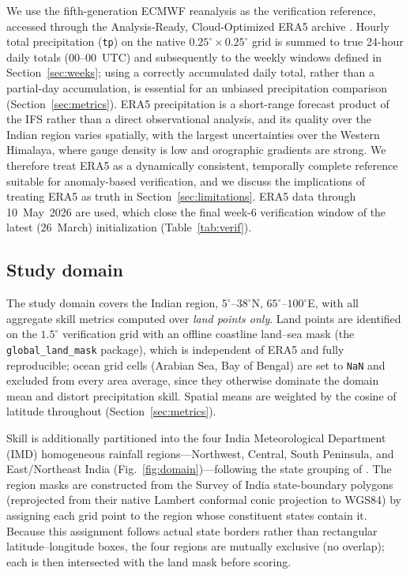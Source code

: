 \documentclass[11pt]{article}
\begin{document}
We use the fifth-generation ECMWF reanalysis
\citep[ERA5;][]{hersbach2020} as the verification reference, accessed
through the Analysis-Ready, Cloud-Optimized ERA5 archive
\citep[ARCO-ERA5;][]{carver2023}. Hourly total precipitation
(\texttt{tp}) on the native $0.25^{\circ}\times0.25^{\circ}$ grid is
summed to true 24-hour daily totals (00--00~UTC) and subsequently to the
weekly windows defined in Section~\ref{sec:weeks}; using a correctly
accumulated daily total, rather than a partial-day accumulation, is
essential for an unbiased precipitation comparison
(Section~\ref{sec:metrics}). ERA5 precipitation is a short-range forecast
product of the IFS rather than a direct observational analysis, and its
quality over the Indian region varies spatially, with the largest
uncertainties over the Western Himalaya, where gauge density is low and
orographic gradients are strong. We therefore treat ERA5 as a
dynamically consistent, temporally complete reference suitable for
anomaly-based verification, and we discuss the implications of treating
ERA5 as truth in Section~\ref{sec:limitations}. ERA5 data through
10~May~2026 are used, which close the final week-6 verification window of
the latest (26~March) initialization (Table~\ref{tab:verif}).

\subsection{Study domain}\label{sec:domain}

The study domain covers the Indian region, $5^{\circ}$--$38^{\circ}$N,
$65^{\circ}$--$100^{\circ}$E, with all aggregate skill metrics computed
over \emph{land points only}. Land points are identified on the
$1.5^{\circ}$ verification grid with an offline coastline land--sea mask
(the \texttt{global\_land\_mask} package), which is independent of ERA5
and fully reproducible; ocean grid cells (Arabian Sea, Bay of Bengal) are
set to \texttt{NaN} and excluded from every area average, since they
otherwise dominate the domain mean and distort precipitation skill.
Spatial means are weighted by the cosine of latitude throughout
(Section~\ref{sec:metrics}).

Skill is additionally partitioned into the four India Meteorological
Department (IMD) homogeneous rainfall regions---Northwest, Central, South
Peninsula, and East/Northeast India (Fig.~\ref{fig:domain})---following
the state grouping of \citet{pai2014}. The region masks are constructed
from the Survey of India state-boundary polygons (reprojected from their
native Lambert conformal conic projection to WGS84) by assigning each
grid point to the region whose constituent states contain it. Because
this assignment follows actual state borders rather than rectangular
latitude--longitude boxes, the four regions are mutually exclusive (no
overlap); each is then intersected with the land mask before scoring.
\end{document}
